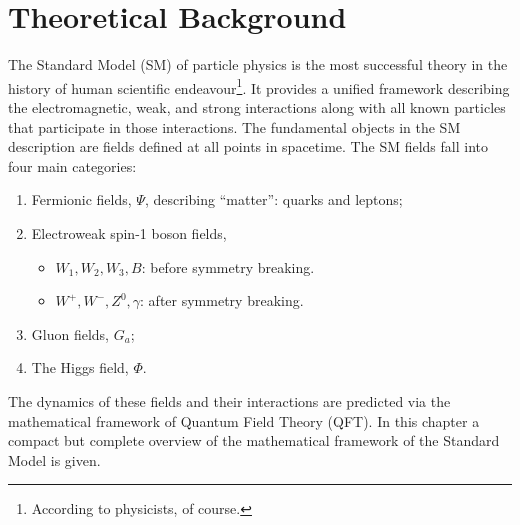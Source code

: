 \graphicspath{{Ch1_Theory/figures/}}

\chapter{Theoretical Background}


The Standard Model (SM) of particle physics is the most successful theory in the history of human scientific endeavour\footnote{According to physicists, of course.}.
It provides a unified framework describing the electromagnetic, weak, and strong interactions along with all known particles that participate in those interactions.
The fundamental objects in the SM description are fields defined at all points in spacetime.
The SM fields fall into four main categories:
\begin{enumerate}
    \itemsep0em 
    \item Fermionic fields, $\Psi$, describing ``matter'': quarks and leptons;
    \item Electroweak spin-1 boson fields,
        \begin{itemize}
            \item $W_1, W_2, W_3, B$: before symmetry breaking.
            \item $W^+, W^-, Z^0, \gamma$: after symmetry breaking.
        \end{itemize}
    \item Gluon fields, $G_a$;
    \item The Higgs field, $\Phi$.
\end{enumerate}

The dynamics of these fields and their interactions are predicted via the mathematical framework of Quantum Field Theory (QFT).
In this chapter a compact but complete overview of the mathematical framework of the Standard Model is given.

